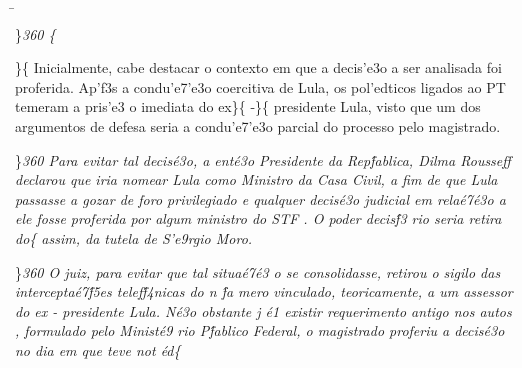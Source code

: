 \ab{} \ltrch{} \b{}
\par \}\pard \ltrpar\qj {}\sl360\widctlpar\wrapdefault\faauto{} \{\rtlch{}
 \ltrch{}  \par \}\{\rtlch{}  \ltrch{}
 Inicialmente, cabe destacar o contexto
em que a decis'e3o a ser analisada foi proferida. Ap'f3s a condu'e7'e3o
coercitiva de Lula, os pol'edticos ligados ao PT temeram a pris'e3 o
imediata do ex\}\{\rtlch{}  \ltrch{} 
-\}\{\rtlch{}  \ltrch{} 
presidente Lula, visto que um dos argumentos de defesa seria a
condu'e7'e3o parcial do processo pelo magistrado.
\par \}\pard \ltrpar\qj {}\sl360\widctlpar\wrapdefault\faauto{} {\rtlch{}  \ltrch{}  \tab Para evitar tal decis\'e3o, a ent\'e3o Presidente da Rep\'fablica, Dilma }{
\rtlch{}  \ltrch{}  Rousseff}{\rtlch{}  \ltrch{}  
 declarou que iria nomear Lula como Ministro da Casa Civil, a fim de que Lula passasse a gozar de foro privilegiado e qualquer decis\'e3o judicial}{\rtlch{}  \ltrch{}   em rela\'e7\'e3o a ele}{\rtlch{}  \ltrch{} 
  }{\rtlch{}  \ltrch{}  fosse}{\rtlch{}  \ltrch{}   proferida por algum ministro do STF}{\rtlch{}  \ltrch{}  . O poder decis\'f3
rio seria}{\rtlch{}  \ltrch{}   retira}{\rtlch{}  \ltrch{}  do}\{\rtlch{}
 \ltrch{}  assim, da tutela de
S'e9rgio Moro.
\par \}\pard \ltrpar\qj {}\sl360\widctlpar\wrapdefault\faauto{} {\rtlch{}  \ltrch{}  O juiz, para evitar que tal situa\'e7\'e3
o se consolidasse, retirou o sigilo das intercepta\'e7\'f5es telef\'f4nicas do n}{\rtlch{}  \ltrch{}  \'fa}{\rtlch{}  \ltrch{}  mero vinculado, teoricamente, a um assessor do }{
\rtlch{}  \ltrch{}  ex}{\rtlch{}  \ltrch{}  -}{\rtlch{}  \ltrch{}  presidente}{\rtlch{}  \ltrch{}  
 Lula. N\'e3o obstante j}{\rtlch{}  \ltrch{}  \'e1 existir requerimento antigo nos autos}{\rtlch{}  \ltrch{}  , }{\rtlch{}  \ltrch{}  formulado pelo Minist\'e9
rio P\'fablico Federal, }{\rtlch{}  \ltrch{}  o magistrado proferiu a decis\'e3o no dia em que teve not}{\rtlch{}  \ltrch{}  \'ed}\{\rtlch{}
